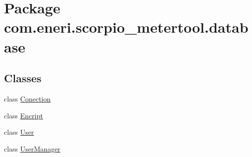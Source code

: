 \hypertarget{namespacecom_1_1eneri_1_1scorpio__metertool_1_1database}{}\section{Package com.\+eneri.\+scorpio\+\_\+metertool.\+database}
\label{namespacecom_1_1eneri_1_1scorpio__metertool_1_1database}
\subsection*{Classes}
\begin{DoxyCompactItemize}
\item 
class \hyperlink{classcom_1_1eneri_1_1scorpio__metertool_1_1database_1_1_conection}{Conection}
\item 
class \hyperlink{classcom_1_1eneri_1_1scorpio__metertool_1_1database_1_1_encript}{Encript}
\item 
class \hyperlink{classcom_1_1eneri_1_1scorpio__metertool_1_1database_1_1_user}{User}
\item 
class \hyperlink{classcom_1_1eneri_1_1scorpio__metertool_1_1database_1_1_user_manager}{User\+Manager}
\end{DoxyCompactItemize}
